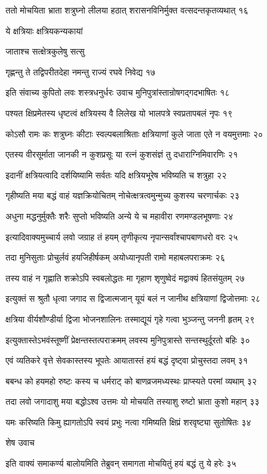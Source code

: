 ततो मोचयिता भ्राता शत्रुघ्नो लीलया हठात्
शरासनविनिर्मुक्त वत्सदन्तकृतव्यथात् १६

ये क्षत्रियाः क्षत्रियकन्यकायां

जाताश्च सत्क्षेत्रकुलेषु सत्सु

गृह्णन्तु ते तद्विपरीतदेहा
नमन्तु राज्यं रघवे निवेद्य १७

इति संवाच्य कुपितो लवः शस्त्रधनुर्धरः
उवाच मुनिपुत्रांस्तान्रोषगद्गदभाषितः १८

पश्यत क्षिप्रमेतस्य धृष्टत्वं क्षत्रियस्य वै
लिलेख यो भालपत्रे स्वप्रतापबलं नृपः १९

कोऽसौ रामः कः शत्रुघ्नः कीटाः स्वल्पबलाश्रिताः
क्षत्रियाणां कुले जाता एते न वयमुत्तमाः २०

एतस्य वीरसूर्माता जानकी न कुशप्रसूः
या रत्नं कुशसंज्ञं तु दधाराग्निमिवारणिः २१

इदानीं क्षत्रियत्वादि दर्शयिष्यामि सर्वतः
यदि क्षत्रियभूरेष भविष्यति च शत्रुहा २२

गृहीष्यति मया बद्धं वाहं यज्ञक्रियोचितम्
नोचेत्क्षत्रत्वमुन्मुच्य कुशस्य चरणार्चकः २३

अधुना मद्धनुर्मुक्तैः शरैः सुप्तो भविष्यति
अन्ये ये च महावीरा रणमण्डलभूषणाः २४

इत्यादिवाक्यमुच्चार्य लवो जग्राह तं हयम्
तृणीकृत्य नृपान्सर्वांश्चापबाणधरो वरः २५

तदा मुनिसुताः प्रोचुर्लवं हयजिहीर्षकम्
अयोध्यानृपती रामो महाबलपराक्रमः २६

तस्य वाहं न गृह्णाति शक्रोऽपि स्वबलोद्धतः
मा गृहाण शृणुष्वेदं मद्वाक्यं हितसंयुतम् २७

इत्युक्तं स श्रुतौ धृत्वा जगाद स द्विजात्मजान्
यूयं बलं न जानीथ क्षत्रियाणां द्विजोत्तमाः २८

क्षत्रिया वीर्यशौण्डीर्या द्विजा भोजनशालिनः
तस्माद्यूयं गृहे गत्वा भुञ्जन्तु जननी हृतम् २९

इत्युक्तास्तेऽभवंस्तूष्णीं प्रेक्षन्तस्तत्पराक्रमम्
लवस्य मुनिपुत्रास्ते सन्तस्थुर्दूरतो बहिः ३०

एवं व्यतिकरे वृत्ते सेवकास्तस्य भूपतेः
आयातास्तं हयं बद्धं दृष्ट्वा प्रोचुस्तदा लवम् ३१

बबन्ध को हयमहो रुष्टः कस्य च धर्मराट्
को बाणव्रजमध्यस्थः प्राप्स्यते परमां व्यथाम् ३२

तदा लवो जगादाशु मया बद्धोऽश्व उत्तमः
यो मोचयति तस्याशु रुष्टो भ्राता कुशो महान् ३३

यमः करिष्यति किमु ह्यागतोऽपि स्वयं प्रभुः
नत्वा गमिष्यति क्षिप्रं शरवृष्ट्या सुतोषितः ३४

शेष उवाच

इति वाक्यं समाकर्ण्य बालोयमिति तेब्रुवन्
समागता मोचयितुं हयं बद्धं तु ये हरेः ३५

